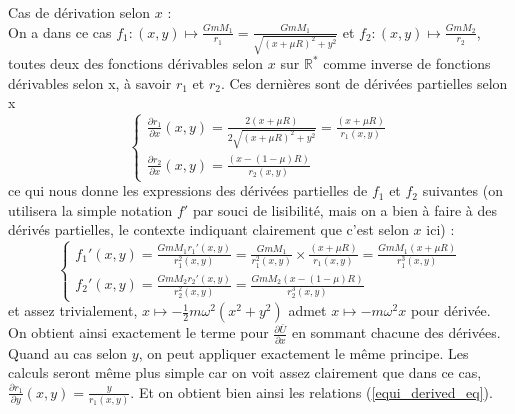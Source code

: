 \documentclass[12pt]{article}
\begin{document}
	Cas de dérivation selon $x$ : \\
	On a dans ce cas $f_1 : (x,y) \longmapsto \frac{GmM_1}{r_1} = \frac{GmM_1}{\sqrt{(x+\mu R)^2 + y^2}}$ et $f_2 : (x,y) \longmapsto \frac{GmM_2}{r_2}$, toutes deux des fonctions dérivables selon $x$ sur $\mathbb{R}^*$ comme inverse de fonctions dérivables selon x, à savoir $r_1$ et $r_2$. Ces dernières sont de dérivées partielles selon x
	\begin{equation*}
		\begin{cases}
			\frac{\partial r_1}{\partial x}(x,y) = \frac{2(x+\mu R)}{2\sqrt{(x+\mu R)^2 + y^2}} = \frac{(x+\mu R)}{r_1(x,y)}
			\\
			\frac{\partial r_2}{\partial x}(x,y) = \frac{(x-(1-\mu)R)}{r_2(x,y)}
		\end{cases}
	\end{equation*}
	ce qui nous donne les expressions des dérivées partielles de $f_1$ et $f_2$ suivantes (on utilisera la simple notation $f'$ par souci de lisibilité, mais on a bien à faire à des dérivés partielles, le contexte indiquant clairement que c'est selon $x$ ici) :
	\begin{equation*}
		\begin{cases}
			f_1'(x,y) = \frac{GmM_1 r_1'(x,y)}{r_1^2(x,y)} = \frac{GmM_1}{r_1^2(x,y)} \times \frac{(x+\mu R)}{r_1(x,y)} = \frac{GmM_1(x+\mu R)}{r_1^3(x,y)}
			\\
			f_2'(x,y) = \frac{GmM_2 r_2'(x,y)}{r_2^2(x,y)} = \frac{GmM_2(x-(1-\mu)R)}{r_2^3(x,y)}
		\end{cases}
	\end{equation*}
	et assez trivialement, $x \longmapsto -\frac{1}{2}m\omega^2(x^2+y^2)$ admet $x \longmapsto -m\omega^2x$ pour dérivée. On obtient ainsi exactement le terme pour $\frac{\partial \bar{U}}{\partial x}$ en sommant chacune des dérivées.
	Quand au cas selon $y$, on peut appliquer exactement le même principe. Les calculs seront même plus simple car on voit assez clairement que dans ce cas, $\frac{\partial r_1}{\partial y}(x,y) = \frac{y}{r_1(x,y)}$.
	Et on obtient bien ainsi les relations (\ref{equi_derived_eq}).
	\\
	
\end{document}
